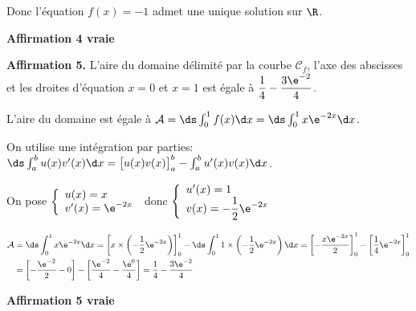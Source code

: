Donc l'équation $f(x)=-1$ admet une unique solution sur $\R$.

\hfill \textbf{Affirmation 4 vraie}

\bigskip

\textbf{Affirmation 5.} L'aire du domaine délimité par la courbe $\mathcal{C}_{f}$, l'axe des abscisses et les droites d'équation $x=0$ et $x=1$ est égale à $\dfrac{1}{4}-\dfrac{3 \e^{-2}}{4}$.

L'aire du domaine est égale à $\mathcal{A} = \ds\int_{0}^{1}f(x) \d x = \ds \int_{0}^{1} x \e^{-2x} \d x$.

On utilise une intégration par parties:
$\ds\int_{a}^{b} u(x)v'(x)\d x =\left [ u(x)v(x)\strut \right ]_{a}^{b} -\int_{a}^{b} u'(x) v(x) \d x$.

On pose
$\left \{
\begin{array}{l}
u(x)=x\\
v'(x)=\e^{-2x}
\end{array}
\right .$
donc
$\left \{
\begin{array}{l}
u'(x)=1\\
v(x)= -\dfrac{1}{2} \e^{-2x}
\end{array}
\right .$

$\aligned[t]
\mathcal{A}
& = \ds \int_{0}^{1} x \e^{-2x} \d x
 = \left [x\times \left ( -\dfrac{1}{2}\e^{-2x} \right ) \right ]_{0}^{1}- \ds\int_{0}^{1} 1\times \left ( -\dfrac{1}{2}\e^{-2x} \right ) \d x
 = \left [-\dfrac{x\e^{-2x} }{2} \right ]_{0}^{1}- \left [ \dfrac{1}{4}\e^{-2x} \right ]_{0}^{1}\\
& = \left [ - \dfrac{\e^{-2}}{2} - 0 \right  ] - \left [ \dfrac{\e^{-2}}{4}  - \dfrac{\e^{0}}{4}\right ]
= \dfrac{1}{4} - \dfrac{3\e^{-2}}{4}
\endaligned$

\hfill \textbf{Affirmation 5 vraie}

\bigskip

